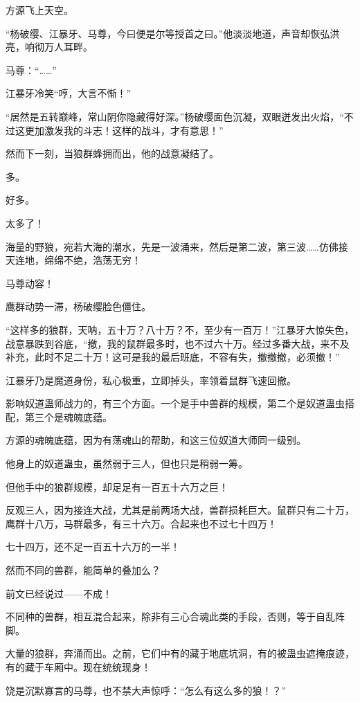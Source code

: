 
\begin{this_body}

方源飞上天空。

“杨破缨、江暴牙、马尊，今曰便是尔等授首之曰。”他淡淡地道，声音却恢弘洪亮，响彻万人耳畔。

马尊：“……”

江暴牙冷笑“哼，大言不惭！”

“居然是五转巅峰，常山阴你隐藏得好深。”杨破缨面色沉凝，双眼迸发出火焰，“不过这更加激发我的斗志！这样的战斗，才有意思！”

然而下一刻，当狼群蜂拥而出，他的战意凝结了。

多。

好多。

太多了！

海量的野狼，宛若大海的潮水，先是一波涌来，然后是第二波，第三波……仿佛接天连地，绵绵不绝，浩荡无穷！

马尊动容！

鹰群动势一滞，杨破缨脸色僵住。

“这样多的狼群，天呐，五十万？八十万？不，至少有一百万！”江暴牙大惊失色，战意暴跌到谷底，“撤，我的鼠群最多时，也不过六十万。经过多番大战，来不及补充，此时不足二十万！这可是我的最后班底，不容有失，撤撤撤，必须撤！”

江暴牙乃是魔道身份，私心极重，立即掉头，率领着鼠群飞速回撤。

影响奴道蛊师战力的，有三个方面。一个是手中兽群的规模，第二个是奴道蛊虫搭配，第三个是魂魄底蕴。

方源的魂魄底蕴，因为有荡魂山的帮助，和这三位奴道大师同一级别。

他身上的奴道蛊虫，虽然弱于三人，但也只是稍弱一筹。

但他手中的狼群规模，却足足有一百五十六万之巨！

反观三人，因为接连大战，尤其是前两场大战，兽群损耗巨大。鼠群只有二十万，鹰群十八万，马群最多，有三十六万。合起来也不过七十四万！

七十四万，还不足一百五十六万的一半！

然而不同的兽群，能简单的叠加么？

前文已经说过——不成！

不同种的兽群，相互混合起来，除非有三心合魂此类的手段，否则，等于自乱阵脚。

大量的狼群，奔涌而出。之前，它们中有的藏于地底坑洞，有的被蛊虫遮掩痕迹，有的藏于车厢中。现在统统现身！

饶是沉默寡言的马尊，也不禁大声惊呼：“怎么有这么多的狼！？”


\end{this_body}
